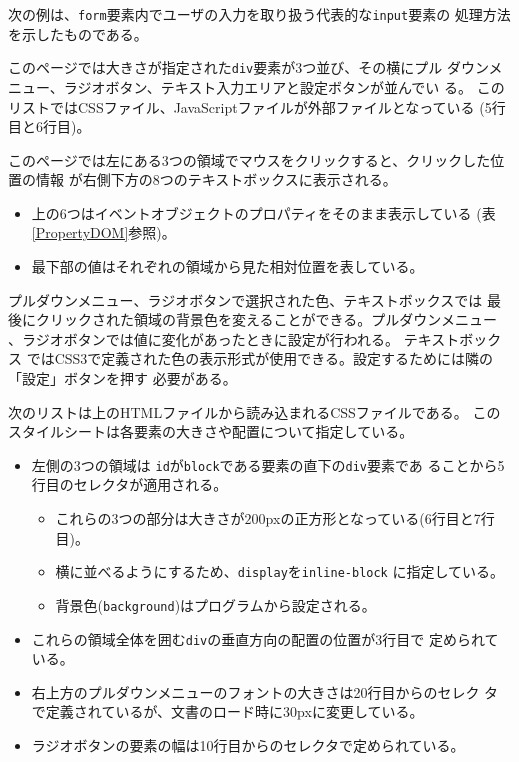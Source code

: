 \begin{Exec}\label{EventInput}\upshape
次の例は、\texttt{form}要素内でユーザの入力を取り扱う代表的な\texttt{input}要素の
 処理方法を示したものである。

このページでは大きさが指定された\texttt{div}要素が3つ並び、その横にプル
 ダウンメニュー、ラジオボタン、テキスト入力エリアと設定ボタンが並んでい
 る。
このリストではCSSファイル、JavaScriptファイルが外部ファイルとなっている
 (5行目と6行目)。

このページでは左にある3つの領域でマウスをクリックすると、クリックした位置の情報
       が右側下方の8つのテキストボックスに表示される。
\begin{itemize}
 \item 上の6つはイベントオブジェクトのプロパティをそのまま表示している
       (表\ref{PropertyDOM}参照)。
 \item 最下部の値はそれぞれの領域から見た相対位置を表している。
\end{itemize}
 プルダウンメニュー、ラジオボタンで選択された色、テキストボックスでは
 最後にクリックされた領域の背景色を変えることができる。プルダウンメニュー
 、ラジオボタンでは値に変化があったときに設定が行われる。
 テキストボックス
 ではCSS3で定義された色の表示形式が使用できる。設定するためには隣の「設定」ボタンを押す
       必要がある。

次のリストは上のHTMLファイルから読み込まれるCSSファイルである。
このスタイルシートは各要素の大きさや配置について指定している。
\begin{itemize}
 \item 左側の3つの領域は
       \texttt{id}が\texttt{block}である要素の直下の\texttt{div}要素であ
       ることから5行目のセレクタが適用される。
\begin{itemize}
 \item これらの3つの部分は大きさが$200$pxの正方形となっている(6行目と7行
       目)。
 \item 横に並べるようにするため、\texttt{display}を\texttt{inline-block}
       に指定している。
 \item 背景色(\texttt{background})はプログラムから設定される。
\end{itemize}
 \item これらの領域全体を囲む\texttt{div}の垂直方向の配置の位置が3行目で
       定められている。
 \item 右上方のプルダウンメニューのフォントの大きさは20行目からのセレク
       タで定義されているが、文書のロード時に30pxに変更している。
 \item ラジオボタンの要素の幅は10行目からのセレクタで定められている。


\end{itemize}
\end{Exec}
